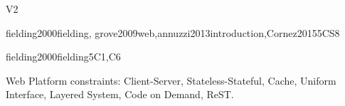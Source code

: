 \begin{syllabus}
\begin{competences}{V2}
    \item {}
    \item {}
    \item {}
\end{competences}

\begin{unit}{\PBDIntroduction}{}{fielding2000fielding, grove2009web,annuzzi2013introduction,Cornez2015}{5}{CS8}
\begin{topics}%
    \item \PBDIntroductionTopicOverview
    \item \PBDIntroductionTopicProgramming
    \item \PBDIntroductionTopicOverviewOf
    \item \PBDIntroductionTopicProgrammingUnder
\end{topics}
\begin{learningoutcomes}
    \item \PBDIntroductionLODescribeHowDevelopment [\Familiarity]
    \item \PBDIntroductionLOListCharacteristics [\Familiarity]
    \item \PBDIntroductionLOWriteAnd [\Familiarity]
    \item \PBDIntroductionLOListTheDisadvantages [\Familiarity]
\end{learningoutcomes}
\end{unit}

\begin{unit}{\PBDWebPlatforms}{}{fielding2000fielding}{5}{C1,C6}
\begin{topics}%
    \item \PBDWebPlatformsTopicWeb
    \item \item Web Platform constraints: Client-Server, Stateless-Stateful, Cache, Uniform Interface, Layered System, Code on Demand, ReST.
    \item \PBDWebPlatformsTopicWebPlatform
    \item \PBDWebPlatformsTopicSoftware
    \item \PBDWebPlatformsTopicWebStandards
\end{topics}
\begin{learningoutcomes}
    \item \PBDWebPlatformsLODesignAndSimple [\Familiarity]
    \item \PBDWebPlatformsLODescribeTheTheOn [\Familiarity]
    \item \PBDWebPlatformsLOCompareAndProgramming [\Familiarity]
    \item \PBDWebPlatformsLODescribeTheSoftware [\Familiarity]
    \item \PBDWebPlatformsLODiscussHowImpact [\Familiarity]
    \item \PBDWebPlatformsLOReview [\Familiarity]
\end{learningoutcomes}
\end{unit}


\end{syllabus}
